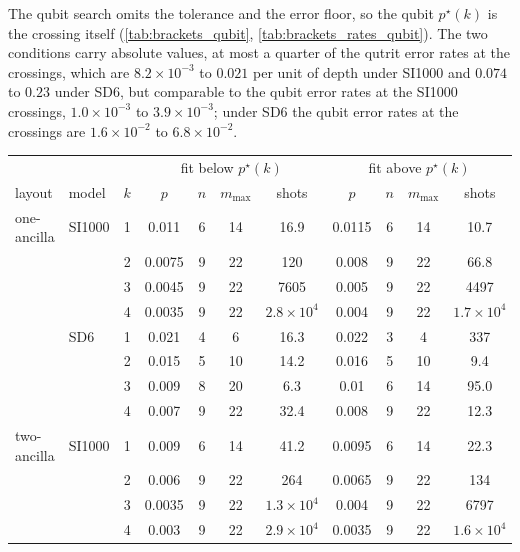 The qubit search omits the tolerance and the error floor, so the qubit $p^\star(k)$ is the crossing itself (\autoref{tab:brackets_qubit}, \autoref{tab:brackets_rates_qubit}). The two conditions carry absolute values, at most a quarter of the qutrit error rates at the crossings, which are $8.2\times10^{-3}$ to $0.021$ per unit of depth under SI1000 and $0.074$ to $0.23$ under SD6, but comparable to the qubit error rates at the SI1000 crossings, $1.0\times10^{-3}$ to $3.9\times10^{-3}$; under SD6 the qubit error rates at the crossings are $1.6\times10^{-2}$ to $6.8\times10^{-2}$.

\begin{table}[tp]
  \centering
  \footnotesize
  \setlength{\tabcolsep}{4pt}
  \begin{tabular}{llc|cccc|cccc}
    \hline
    & & & \multicolumn{4}{c|}{fit below $p^\star(k)$} & \multicolumn{4}{c}{fit above $p^\star(k)$} \\
    layout & model & $k$ & $p$ & $n$ & $m_{\max}$ & shots & $p$ & $n$ & $m_{\max}$ & shots \\
    \hline
    one-ancilla & SI1000 & 1 & 0.011 & 6 & 14 & 16.9 & 0.0115 & 6 & 14 & 10.7 \\
     &  & 2 & 0.0075 & 9 & 22 & 120 & 0.008 & 9 & 22 & 66.8 \\
     &  & 3 & 0.0045 & 9 & 22 & 7605 & 0.005 & 9 & 22 & 4497 \\
     &  & 4 & 0.0035 & 9 & 22 & $2.8\times10^{4}$ & 0.004 & 9 & 22 & $1.7\times10^{4}$ \\
    \hline
     & SD6 & 1 & 0.021 & 4 & 6 & 16.3 & 0.022 & 3 & 4 & 337 \\
     &  & 2 & 0.015 & 5 & 10 & 14.2 & 0.016 & 5 & 10 & 9.4 \\
     &  & 3 & 0.009 & 8 & 20 & 6.3 & 0.01 & 6 & 14 & 95.0 \\
     &  & 4 & 0.007 & 9 & 22 & 32.4 & 0.008 & 9 & 22 & 12.3 \\
    \hline
    two-ancilla & SI1000 & 1 & 0.009 & 6 & 14 & 41.2 & 0.0095 & 6 & 14 & 22.3 \\
     &  & 2 & 0.006 & 9 & 22 & 264 & 0.0065 & 9 & 22 & 134 \\
     &  & 3 & 0.0035 & 9 & 22 & $1.3\times10^{4}$ & 0.004 & 9 & 22 & 6797 \\
     &  & 4 & 0.003 & 9 & 22 & $2.9\times10^{4}$ & 0.0035 & 9 & 22 & $1.6\times10^{4}$ \\

\end{tabular}
\end{table}

